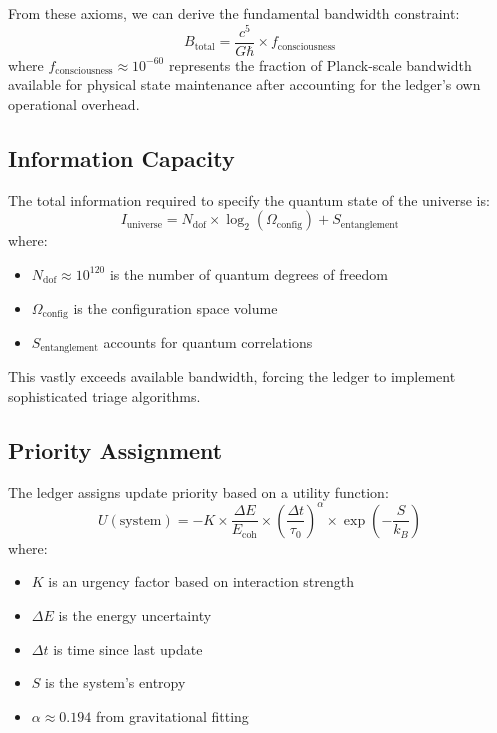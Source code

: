\documentclass[twocolumn,prd,amsmath,amssymb,aps,superscriptaddress,nofootinbib]{revtex4-2}
\begin{document}
From these axioms, we can derive the fundamental bandwidth constraint:
\begin{equation}
B_{\text{total}} = \frac{c^5}{G\hbar} \times f_{\text{consciousness}}
\label{eq:btotal}
\end{equation}
where $f_{\text{consciousness}} \approx 10^{-60}$ represents the fraction of Planck-scale bandwidth available for physical state maintenance after accounting for the ledger's own operational overhead.

\subsection{Information Capacity}

The total information required to specify the quantum state of the universe is:
\begin{equation}
I_{\text{universe}} = N_{\text{dof}} \times \log_2(\Omega_{\text{config}}) + S_{\text{entanglement}}
\end{equation}
where:
\begin{itemize}
\item $N_{\text{dof}} \approx 10^{120}$ is the number of quantum degrees of freedom
\item $\Omega_{\text{config}}$ is the configuration space volume  
\item $S_{\text{entanglement}}$ accounts for quantum correlations
\end{itemize}

This vastly exceeds available bandwidth, forcing the ledger to implement sophisticated triage algorithms.

\subsection{Priority Assignment}

The ledger assigns update priority based on a utility function:
\begin{equation}
U(\text{system}) = -K \times \frac{\Delta E}{E_{\text{coh}}} \times \left(\frac{\Delta t}{\tau_0}\right)^\alpha \times \exp\left(-\frac{S}{k_B}\right)
\label{eq:utility}
\end{equation}
where:
\begin{itemize}
\item $K$ is an urgency factor based on interaction strength
\item $\Delta E$ is the energy uncertainty
\item $\Delta t$ is time since last update
\item $S$ is the system's entropy
\item $\alpha \approx 0.194$ from gravitational fitting
\end{itemize}
\end{document}
